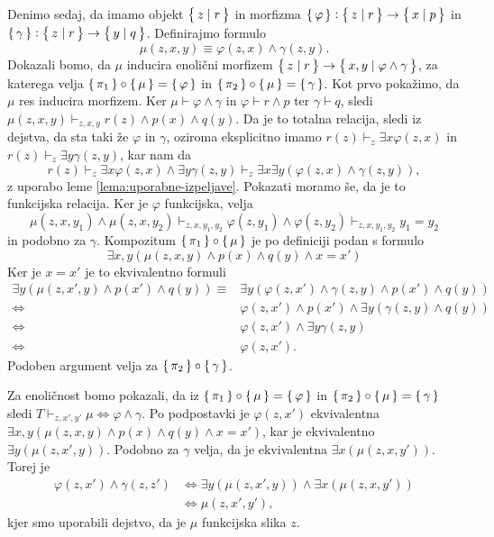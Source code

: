 \documentclass[../kategoricna_logika.tex]{subfiles}
\begin{document}
\begin{dokaz}
\begin{enumerate}[label=(\roman*)]
    Denimo sedaj, da imamo objekt $\left\lbrace\,z \mid r\,\right\rbrace$ in morfizma
    $\left\lbrace\,\varphi\,\right\rbrace : \left\lbrace\,z \mid r\,\right\rbrace \to \left\lbrace\,x \mid p\,\right\rbrace$ in
    $\left\lbrace\,\gamma\,\right\rbrace : \left\lbrace\,z \mid r\,\right\rbrace \to \left\lbrace\,y \mid q\,\right\rbrace$.  Definirajmo
    formulo
    \[ \mu(z,x,y) \equiv \varphi(z,x) \land \gamma(z,y). \] Dokazali
    bomo, da $\mu$ inducira enolični morfizem
    $\left\lbrace\,z \mid r\,\right\rbrace \to \left\lbrace\,x,y \mid \varphi \land \gamma\,\right\rbrace$, za
    katerega velja $\left\lbrace\,\pi_1\,\right\rbrace \circ \left\lbrace\,\mu\,\right\rbrace = \left\lbrace\,\varphi\,\right\rbrace$ in
    $\left\lbrace\,\pi_2\,\right\rbrace \circ \left\lbrace\,\mu\,\right\rbrace = \left\lbrace\,\gamma\,\right\rbrace$.  Kot prvo pokažimo,
    da $\mu$ res inducira morfizem.  Ker
    $\mu \vdash \varphi \land \gamma$ in $\varphi \vdash r \land p$
    ter $\gamma \vdash q$, sledi
    $\mu(z,x,y) \vdash_{z,x,y}r(z) \land p(x) \land q(y)$.  Da je to
    totalna relacija, sledi iz dejstva, da sta taki že $\varphi$ in
    $\gamma$, oziroma eksplicitno imamo
    $r(z) \vdash_z \exists x \varphi(z,x)$ in
    $r(z) \vdash_z \exists y \gamma(z,y)$, kar nam da
    \[ r(z) \vdash_z \exists x \varphi(z,x) \land \exists y
      \gamma(z,y) \vdash_z \exists x \exists y (\varphi(z,x) \land
      \gamma(z,y)), \] z uporabo leme \ref{lema:uporabne-izpeljave}.
    Pokazati moramo še, da je to funkcijska relacija.  Ker je
    $\varphi$ funkcijska, velja
    \[ \mu(z,x,y_1) \land \mu(z,x,y_2) \vdash_{z,x,y_1,y_2}
      \varphi(z,y_1) \land \varphi(z,y_2) \vdash_{z,x,y_1,y_2} y_1 =
      y_2 \] in podobno za $\gamma$.  Kompozitum
    $\left\lbrace\,\pi_1\,\right\rbrace \circ \left\lbrace\,\mu\,\right\rbrace$ je po definiciji podan s formulo
    \[ \exists x,y(\mu(z,x,y) \land p(x) \land q(y) \land x=x') \] Ker
    je $x = x'$ je to ekvivalentno formuli
    \begin{align*}
      \exists y(\mu(z,x',y) \land p(x') \land q(y)) \equiv&
                                                            \exists y(\varphi(z,x') \land \gamma(z,y) \land p(x') \land q(y)) \\
      \iff& \varphi(z,x') \land p(x') \land \exists y(\gamma(z,y) \land q(y)) \\
      \iff& \varphi(z,x') \land \exists y \gamma(z,y) \\
      \iff& \varphi(z,x').
    \end{align*}
    Podoben argument velja za $\left\lbrace\,\pi_2\,\right\rbrace \circ \left\lbrace\,\gamma\,\right\rbrace$.

    Za enoličnost bomo pokazali, da iz
    $\left\lbrace\,\pi_1\,\right\rbrace \circ \left\lbrace\,\mu\,\right\rbrace = \left\lbrace\,\varphi\,\right\rbrace$ in
    $\left\lbrace\,\pi_2\,\right\rbrace \circ \left\lbrace\,\mu\,\right\rbrace = \left\lbrace\,\gamma\,\right\rbrace$ sledi
    $T \vdash_{z,x',y'} \mu \iff \varphi \land \gamma$.  Po
    podpostavki je $\varphi(z,x')$ ekvivalentna
    $\exists x,y(\mu(z,x,y) \land p(x) \land q(y) \land x=x')$, kar je
    ekvivalentno $\exists y(\mu(z,x',y))$.  Podobno za $\gamma$ velja,
    da je ekvivalentna $\exists x(\mu(z,x,y'))$. Torej je
    \begin{align*}
      \varphi(z,x') \land \gamma(z,z') &\iff \exists y(\mu(z,x',y)) \land \exists x(\mu(z,x,y')) \\
                                       &\iff \mu(z,x',y'),
    \end{align*}
    kjer smo uporabili dejstvo, da je $\mu$ funkcijska slika $z$.


\end{enumerate}
\end{dokaz}
\end{document}
